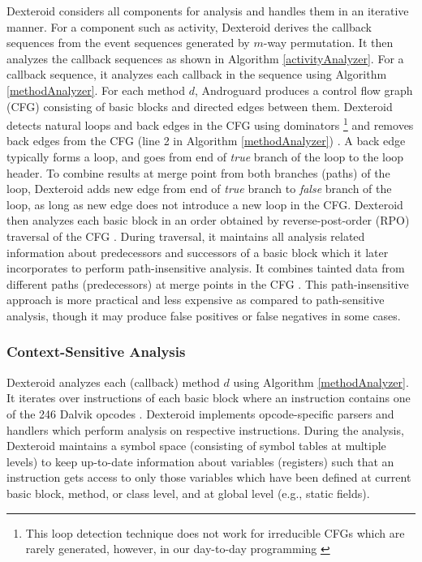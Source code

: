 \documentclass[10pt]{elsarticle}
\begin{document}
Dexteroid considers all components for analysis and handles them in an iterative manner. For a component such as activity, Dexteroid derives the callback sequences from the event sequences generated by $m$-way permutation. It then analyzes the callback sequences as shown in Algorithm \ref{activityAnalyzer}. For a callback sequence, it analyzes each callback in the sequence using Algorithm \ref{methodAnalyzer}. For each method $d$, Androguard \cite{Androguard} produces a control flow graph (CFG) consisting of basic blocks and directed edges between them. Dexteroid detects natural loops and back edges in the CFG using dominators \footnote{This loop detection technique does not work for irreducible CFGs which are rarely generated, however, in our day-to-day programming \cite{AhoCompilers}} \cite{AhoCompilers} and removes back edges from the CFG (line 2 in Algorithm \ref{methodAnalyzer}) . A back edge typically forms a loop, and goes from end of \emph{true} branch of the loop to the loop header. To combine results at merge point from both branches (paths) of the loop, Dexteroid adds new edge from end of \emph{true} branch to \emph{false} branch of the loop, as long as new edge does not introduce a new loop in the CFG. Dexteroid then analyzes each basic block in an order obtained by reverse-post-order (RPO) traversal of the CFG \cite{RPOTraversal}. During traversal, it maintains all analysis related information about predecessors and successors of a basic block which it later incorporates to perform path-insensitive analysis. It combines tainted data from different paths (predecessors) at merge points in the CFG \cite{staticAnalysis}. This path-insensitive approach is more practical and less expensive as compared to path-sensitive analysis, though it may produce false positives or false negatives in some cases.


\subsubsection{Context-Sensitive Analysis} \label{secContextSensitive}

Dexteroid analyzes each (callback) method $d$ using Algorithm \ref{methodAnalyzer}. It iterates over instructions of each basic block where an instruction contains one of the 246 Dalvik opcodes \cite{DalvikByteCode}. Dexteroid implements opcode-specific parsers and handlers which perform analysis on respective instructions. During the analysis, Dexteroid maintains a symbol space (consisting of symbol tables at multiple levels) to keep up-to-date information about variables (registers) such that an instruction gets access to only those variables which have been defined at current basic block, method, or class level, and at global level (e.g., static fields). 
\end{document}
